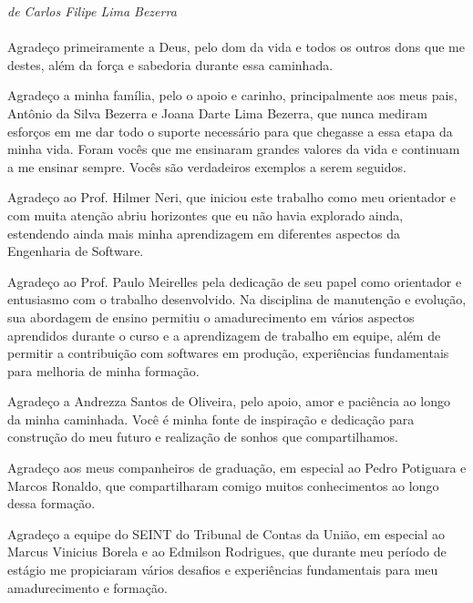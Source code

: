 \begin{agradecimentos}

%

\emph{de Carlos Filipe Lima Bezerra} \\ \\

%

Agradeço primeiramente a Deus, pelo dom da vida e todos os outros dons que me destes, além da força e sabedoria durante essa caminhada.

%

Agradeço a minha família, pelo o apoio e carinho, principalmente aos meus pais, Antônio da Silva Bezerra e Joana Darte Lima Bezerra, que nunca mediram esforços em me dar todo o suporte necessário para que chegasse a essa etapa da minha vida. Foram vocês que me ensinaram grandes valores da vida e continuam a me ensinar sempre. Vocês são verdadeiros exemplos a serem seguidos.

%

Agradeço ao Prof. Hilmer Neri, que iniciou este trabalho como meu orientador e com muita atenção  abriu horizontes que eu não havia explorado ainda, estendendo ainda mais minha aprendizagem em diferentes aspectos da Engenharia de Software.

%

Agradeço ao Prof. Paulo Meirelles pela dedicação de seu papel como orientador e entusiasmo com o trabalho desenvolvido. Na disciplina de manutenção e evolução, sua abordagem de ensino permitiu o amadurecimento em vários aspectos aprendidos durante o curso e a aprendizagem de trabalho em equipe, além de permitir a contribuição com softwares em produção, experiências fundamentais para melhoria de minha formação.

%

Agradeço a Andrezza Santos de Oliveira, pelo apoio, amor e paciência ao longo da minha caminhada. Você é minha fonte de inspiração e dedicação para construção do meu futuro e realização de sonhos que compartilhamos.

%

Agradeço aos meus companheiros de graduação, em especial ao Pedro Potiguara e Marcos Ronaldo, que compartilharam comigo muitos conhecimentos ao longo dessa formação.

%

Agradeço a equipe do SEINT do Tribunal de Contas da União, em especial ao Marcus Vinicius Borela e ao Edmilson Rodrigues, que durante meu período de estágio me propiciaram vários desafios e experiências fundamentais para meu amadurecimento e formação.

\end{agradecimentos}